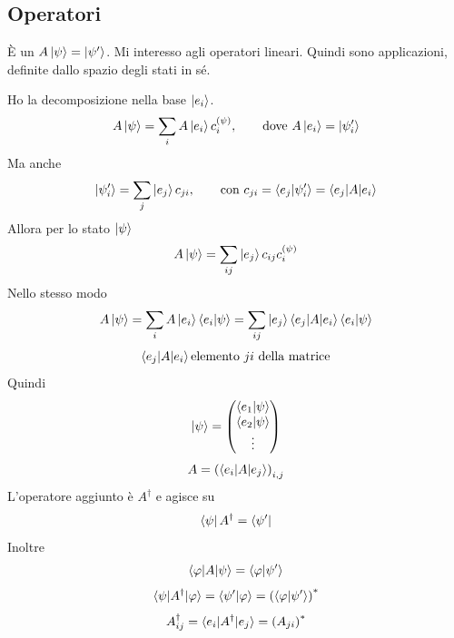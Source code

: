 \subsection{Operatori}
\`E un \(A \ket{\psi} = \ket{\psi'}\). Mi interesso agli operatori lineari.
Quindi sono applicazioni, definite dallo spazio degli stati in sé.

\bigskip
\noindent
Ho la decomposizione nella base \(\ket{e_i}\).
\[
  A\ket{\psi} = \sum_i A \ket{e_i} c_i^{(\psi)},
  \qquad
  \text{dove } A \ket{e_i} = \ket{\psi_i'}
\]
Ma anche
\[
  \ket{\psi_i'} = \sum_j \ket{e_j}c_{ji},
  \qquad
  \text{con } c_{ji} = \braket{e_j|\psi_i'} = \braket{e_j|A|e_i}
\]
Allora per lo stato \(\ket{\psi}\)
\[
  A\ket{\psi} = \sum_{ij} \ket{e_j} c_{ij} c_i^{(\psi)}
\]
Nello stesso modo
\[
  A\ket{\psi}
  = \sum_i A \ket{e_i} \braket{e_i|\psi}
  = \sum_{ij} \ket{e_j} \braket{e_j|A|e_i} \braket{e_i|\psi}
\]
\[
  \braket{e_j|A|e_i} \text{elemento } ji \text{ della matrice}
\]
Quindi
\[
  \ket{\psi} = \begin{pmatrix}
    \braket{e_1|\psi} \\
    \braket{e_2|\psi} \\
    \vdots
  \end{pmatrix}
\]
\[
  A = \left( \braket{e_i|A|e_j} \right)_{i,j}
\]
L'operatore aggiunto è \(A^\dag\) e agisce su
\[
  \bra{\psi}A^\dag = \bra{\psi'}
\]
Inoltre
\[
  \braket{\varphi|A|\psi} = \braket{\varphi|\psi'}
\]
\[
  \braket{\psi|A^\dag|\varphi}
  = \braket{\psi'|\varphi}
  = \left( \braket{\varphi|\psi'} \right)^*
\]
\[
  A_{ij}^\dag = \braket{e_i|A^\dag|e_j} = \left( A_{ji} \right)^*
\]